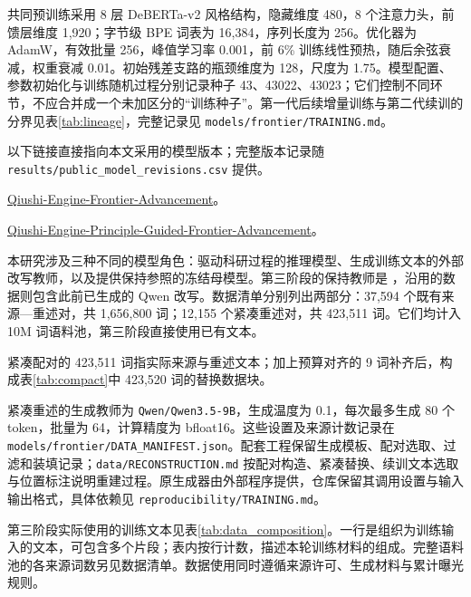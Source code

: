 共同预训练采用 8 层 DeBERTa-v2 风格结构，隐藏维度 480，8 个注意力头，前馈层维度 1,920；字节级 BPE 词表为 16,384，序列长度为 256。优化器为 AdamW，有效批量 256，峰值学习率 0.001，前 6\% 训练线性预热，随后余弦衰减，权重衰减 0.01。初始残差支路的瓶颈维度为 128，尺度为 1.75。模型配置、参数初始化与训练随机过程分别记录种子 43、43022、43023；它们控制不同环节，不应合并成一个未加区分的“训练种子”。第一代后续增量训练与第二代续训的分界见表\ref{tab:lineage}，完整记录见 \nolinkurl{models/frontier/TRAINING.md}。

以下链接直接指向本文采用的模型版本；完整版本记录随 \nolinkurl{results/public_model_revisions.csv} 提供。

\begin{description}[font=\normalfont\bfseries,leftmargin=2em,style=nextline]
\item[\Frontier]
\href{https://huggingface.co/leslie721007/Qiushi-Engine-Frontier-Advancement/tree/5eb20f9c5088f40183269bb2c97381711aea0143}{Qiushi-Engine-Frontier-Advancement}。
\item[\Guided]
\href{https://huggingface.co/leslie721007/Qiushi-Engine-Principle-Guided-Frontier-Advancement/tree/ce7eabf0dfbd3d1393670f41f610bdccbdbe45d1}{Qiushi-Engine-Principle-Guided-Frontier-Advancement}。
\end{description}

本研究涉及三种不同的模型角色：驱动科研过程的推理模型、生成训练文本的外部改写教师，以及提供保持参照的冻结母模型。第三阶段的保持教师是 \Frontier{}，沿用的数据则包含此前已生成的 Qwen 改写。数据清单分别列出两部分：37,594 个既有来源—重述对，共 1,656,800 词；12,155 个紧凑重述对，共 423,511 词。它们均计入 10M 词语料池，第三阶段直接使用已有文本。

紧凑配对的 423,511 词指实际来源与重述文本；加上预算对齐的 9 词补齐后，构成表\ref{tab:compact}中 423,520 词的替换数据块。

紧凑重述的生成教师为 \nolinkurl{Qwen/Qwen3.5-9B}，生成温度为 0.1，每次最多生成 80 个 token，批量为 64，计算精度为 bfloat16。这些设置及来源计数记录在 \nolinkurl{models/frontier/DATA_MANIFEST.json}。配套工程保留生成模板、配对选取、过滤和装填记录；\nolinkurl{data/RECONSTRUCTION.md} 按配对构造、紧凑替换、续训文本选取与位置标注说明重建过程。原生成器由外部程序提供，仓库保留其调用设置与输入输出格式，具体依赖见 \nolinkurl{reproducibility/TRAINING.md}。

第三阶段实际使用的训练文本见表\ref{tab:data_composition}。一行是组织为训练输入的文本，可包含多个片段；表内按行计数，描述本轮训练材料的组成。完整语料池的各来源词数另见数据清单。数据使用同时遵循来源许可、生成材料与累计曝光规则。


